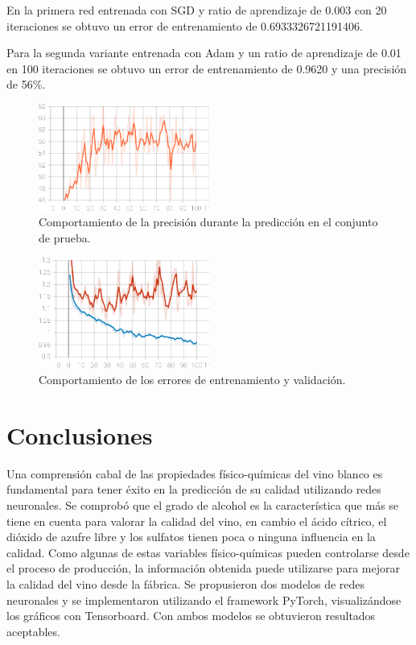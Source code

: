 \documentclass[runningheads]{llncs}
\begin{document}
En la primera red entrenada con SGD y ratio de aprendizaje de 0.003 con 20 iteraciones se obtuvo un error de entrenamiento de 0.6933326721191406.

Para la segunda variante entrenada con Adam y un ratio de aprendizaje de 0.01 en 100 iteraciones se obtuvo un error de entrenamiento de 0.9620 y una precisi{\'o}n de 56\%.

\begin{figure}[htbp]
	\centering
	\includegraphics[width=0.5\textwidth]{images/Accuracy.eps}
	\caption{Comportamiento de la precisi{\'o}n durante la predicci{\'o}n en el conjunto de prueba.}
	\label{accuracy}
\end{figure}

\begin{figure}[htbp]
	\centering
	\includegraphics[width=0.5\textwidth]{images/LOSS.eps}
	\caption{Comportamiento de los errores de entrenamiento y validaci{\'o}n.}
	\label{loss}
\end{figure}  

\section{Conclusiones}
Una comprensi{\'o}n cabal de las propiedades f{\'i}sico-qu{\'i}micas del vino blanco es fundamental para tener {\'e}xito en la predicci{\'o}n de su calidad utilizando redes neuronales. Se comprob{\'o} que el grado de alcohol es la caracter{\'i}stica que m{\'a}s se tiene en cuenta para valorar la calidad del vino, en cambio el {\'a}cido c{\'i}trico, el di{\'o}xido de azufre libre y los sulfatos tienen poca o ninguna influencia en la calidad. Como algunas de estas variables f{\'i}sico-qu{\'i}micas pueden controlarse desde el proceso de producci{\'o}n,  la informaci{\'o}n obtenida puede utilizarse para mejorar la calidad del vino desde la f{\'a}brica. Se propusieron dos modelos de redes neuronales y se implementaron utilizando el framework PyTorch, visualiz{\'a}ndose los gr{\'a}ficos con Tensorboard. Con ambos modelos se obtuvieron resultados aceptables.

%
%
%


%
\end{document}
